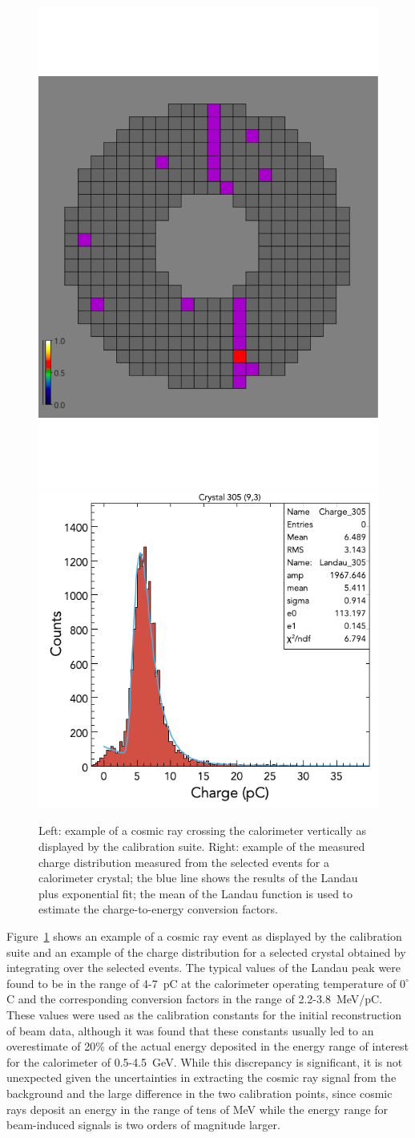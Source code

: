 \begin{figure}
\includegraphics[height=0.58\columnwidth]{fig/ftcal_cosmicview.pdf}
\includegraphics[height=0.5\columnwidth]{fig/ftcal_cosmiccharge.png}
\caption{Left: example of a cosmic ray crossing the calorimeter vertically as displayed by the calibration suite.
  Right: example of the measured charge distribution measured from the selected events for a calorimeter crystal;
  the blue line shows the results of the Landau plus exponential fit; the mean of the Landau function is used to
  estimate the charge-to-energy conversion factors.}
\label{fig:ftcal_cosmic}
\end{figure}

Figure~\ref{fig:ftcal_cosmic} shows an example of a cosmic ray event as displayed by the calibration suite and an
example of the charge distribution for a selected crystal obtained by integrating over the selected events. The
typical values of the Landau peak were found to be in the range of 4-7~pC at the calorimeter operating temperature
of $0^\circ$C and the corresponding conversion factors in the range of 2.2-3.8~MeV/pC. These values were used as
the calibration constants for the initial reconstruction of beam data, although it was found that these constants
usually led to an overestimate of 20\% of the actual energy deposited in the energy range of interest for the
calorimeter of 0.5-4.5~GeV. While this discrepancy is significant, it is not unexpected given the uncertainties in
extracting the cosmic ray signal from the background and the large difference in the two calibration points, since
cosmic rays deposit an energy in the range of tens of MeV while the energy range  for beam-induced signals is two
orders of magnitude larger.

